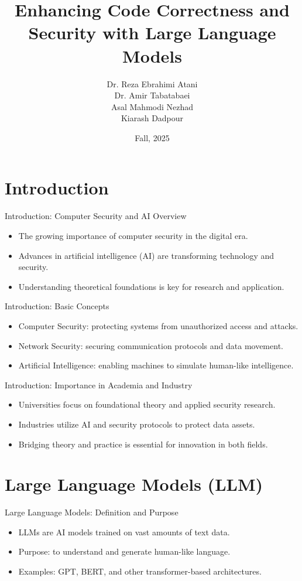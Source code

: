 \documentclass[t,ignorenonframetext]{beamer}
\title[Security & AI Overview]{Enhancing Code Correctness and Security with Large Language Models}
\author[University of Guilan]{Dr. Reza Ebrahimi Atani \\ Dr. Amir Tabatabaei \\ Asal Mahmodi Nezhad \\ Kiarash Dadpour}
\date{Fall, 2025}
\begin{document}
\frame{
\maketitle
}

\section{Introduction}
\begin{frame}{Introduction: Computer Security and AI Overview}
\begin{itemize}
\item The growing importance of computer security in the digital era.
\item Advances in artificial intelligence (AI) are transforming technology and security.
\item Understanding theoretical foundations is key for research and application.
\end{itemize}
\end{frame}

\begin{frame}{Introduction: Basic Concepts}
\begin{itemize}
\item Computer Security: protecting systems from unauthorized access and attacks.
\item Network Security: securing communication protocols and data movement.
\item Artificial Intelligence: enabling machines to simulate human-like intelligence.
\end{itemize}
\end{frame}

\begin{frame}{Introduction: Importance in Academia and Industry}
\begin{itemize}
\item Universities focus on foundational theory and applied security research.
\item Industries utilize AI and security protocols to protect data assets.
\item Bridging theory and practice is essential for innovation in both fields.
\end{itemize}
\end{frame}

\section{Large Language Models (LLM)}
\begin{frame}{Large Language Models: Definition and Purpose}
\begin{itemize}
\item LLMs are AI models trained on vast amounts of text data.
\item Purpose: to understand and generate human-like language.
\item Examples: GPT, BERT, and other transformer-based architectures.
\end{itemize}
\end{frame}
\end{document}
